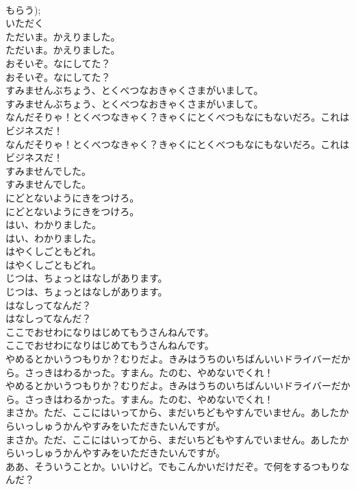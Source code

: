 \documentclass[8pt]{extreport}
\begin{document}
\begin{CJK}{UTF8}{min}
\\	もらう); 
\\	いただく
\\	ただいま。かえりました。	
\\	ただいま。かえりました。 
\\	おそいぞ。なにしてた？	
\\	おそいぞ。なにしてた？ 
\\	すみませんぶちょう、とくべつなおきゃくさまがいまして。	
\\	すみませんぶちょう、とくべつなおきゃくさまがいまして。 
\\	なんだそりゃ！とくべつなきゃく？きゃくにとくべつもなにもないだろ。これはビジネスだ！	
\\	なんだそりゃ！とくべつなきゃく？きゃくにとくべつもなにもないだろ。これはビジネスだ！ 
\\	すみませんでした。	
\\	すみませんでした。 
\\	にどとないようにきをつけろ。	
\\	にどとないようにきをつけろ。 
\\	はい、わかりました。	
\\	はい、わかりました。 
\\	はやくしごともどれ。	
\\	はやくしごともどれ。 
\\	じつは、ちょっとはなしがあります。	
\\	じつは、ちょっとはなしがあります。 
\\	はなしってなんだ？	
\\	はなしってなんだ？ 
\\	ここでおせわになりはじめてもうさんねんです。	
\\	ここでおせわになりはじめてもうさんねんです。 
\\	やめるとかいうつもりか？むりだよ。きみはうちのいちばんいいドライバーだから。さっきはわるかった。すまん。たのむ、やめないでくれ！	
\\	やめるとかいうつもりか？むりだよ。きみはうちのいちばんいいドライバーだから。さっきはわるかった。すまん。たのむ、やめないでくれ！ 
\\	まさか。ただ、ここにはいってから、まだいちどもやすんでいません。あしたからいっしゅうかんやすみをいただきたいんですが。	
\\	まさか。ただ、ここにはいってから、まだいちどもやすんでいません。あしたからいっしゅうかんやすみをいただきたいんですが。 
\\	ああ、そういうことか。いいけど。でもこんかいだけだぞ。で何をするつもりなんだ？	

\end{CJK}
\end{document}
